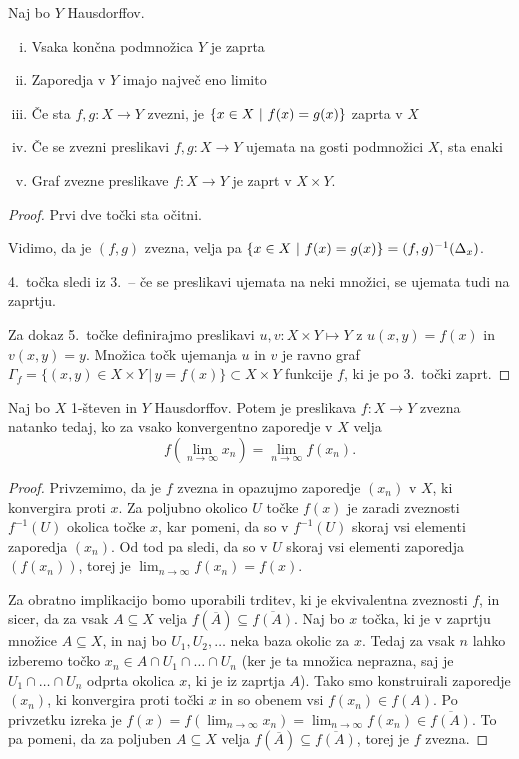 \begin{izrek}
Naj bo $Y$ Hausdorffov.

\begin{enumerate}[i)]
\item Vsaka končna podmnožica $Y$ je zaprta
\item Zaporedja v $Y$ imajo največ eno limito
\item Če sta $f, g \colon X \to Y$ zvezni, je
$\left\{x \in X~\middle\vert~f(x) = g(x)\right\}$ zaprta v $X$
\item Če se zvezni preslikavi $f, g \colon X \to Y$ ujemata na
gosti podmnožici $X$, sta enaki
\item Graf zvezne preslikave $f \colon X \to Y$ je zaprt v
$X \times Y$.
\end{enumerate}
\end{izrek}

\begin{proof}
Prvi dve točki sta očitni.

Vidimo, da je $(f,g)$ zvezna, velja pa
$\left\{x \in X~\middle\vert~f(x) = g(x)\right\} = (f,g)^{-1}(\Delta_x)$.

4.\ točka sledi iz 3.\ -- če se preslikavi ujemata na neki množici,
se ujemata tudi na zaprtju.

Za dokaz 5.\ točke definirajmo preslikavi $u, v: X \times Y \mapsto Y$ z $u(x,y) = f(x)$ in $v(x,y) = y$.
Množica točk ujemanja $u$ in $v$ je ravno graf $\Gamma_f = \{(x,y) \in X \times Y\, |\, y = f(x)\} \subset X \times Y$
funkcije $f$, ki je po 3.\ točki zaprt.
\end{proof}

\begin{izrek}
Naj bo $X$ 1-števen in $Y$ Hausdorffov. Potem je preslikava
$f \colon X \to Y$ zvezna natanko tedaj, ko za vsako konvergentno
zaporedje v $X$ velja
\[
f\left(\lim_{n\to\infty} x_n\right) = \lim_{n\to\infty} f(x_n).
\]
\end{izrek}

\begin{proof}
    Privzemimo, da je $f$ zvezna in opazujmo zaporedje $(x_n)$ v $X$, ki konvergira proti $x$. Za poljubno okolico
    $U$ točke $f(x)$ je zaradi zveznosti $f^{-1}(U)$ okolica točke $x$, kar pomeni, da so v $f^{-1}(U)$ skoraj vsi
    elementi zaporedja $(x_n)$. Od tod pa sledi, da so v $U$ skoraj vsi elementi zaporedja $(f(x_n))$, torej je
    $\lim_{n\to\infty} f(x_n) = f(x)$.

    Za obratno implikacijo bomo uporabili trditev, ki je ekvivalentna zveznosti $f$, in sicer, da za vsak $A \subseteq X$
    velja $f(\overline{A}) \subseteq \overline{f(A)}$. Naj bo $x$ točka, ki je v zaprtju množice $A \subseteq X$, in naj
    bo $U_1, U_2, \ldots$ neka baza okolic za $x$. Tedaj za vsak $n$ lahko izberemo točko $x_n \in A \cap U_1 \cap \ldots \cap U_n$
    (ker je ta množica neprazna, saj je $U_1 \cap \ldots \cap U_n$ odprta okolica $x$, ki je iz zaprtja $A$). Tako smo konstruirali
    zaporedje $(x_n)$, ki konvergira proti točki $x$ in so obenem vsi $f(x_n) \in f(A)$. Po privzetku izreka je $f(x) = f\left(\lim_{n\to\infty} x_n\right) 
    = \lim_{n\to\infty} f(x_n) \in \overline{f(A)}$. To pa pomeni, da za poljuben $A \subseteq X$ velja $f(\overline{A}) \subseteq \overline{f(A)}$,
    torej je $f$ zvezna.
\end{proof}

